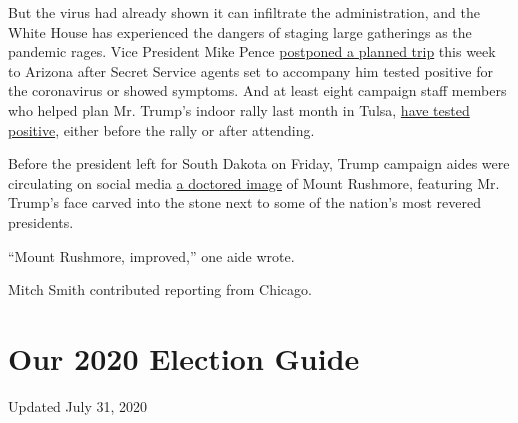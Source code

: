 But the virus had already shown it can infiltrate the administration,
and the White House has experienced the dangers of staging large
gatherings as the pandemic rages. Vice President Mike Pence
\href{https://www.nytimes.com/2020/07/02/us/politics/pence-covid.html}{postponed
a planned trip} this week to Arizona after Secret Service agents set to
accompany him tested positive for the coronavirus or showed symptoms.
And at least eight campaign staff members who helped plan Mr. Trump's
indoor rally last month in Tulsa,
\href{https://www.nytimes.com/2020/06/22/us/politics/trump-campaign-coronavirus-tulsa.html}{have
tested positive}, either before the rally or after attending.

Before the president left for South Dakota on Friday, Trump campaign
aides were circulating on social media
\href{https://twitter.com/abigailmarone/status/1279044148184694787}{a
doctored image} of Mount Rushmore, featuring Mr. Trump's face carved
into the stone next to some of the nation's most revered presidents.

``Mount Rushmore, improved,'' one aide wrote.

Mitch Smith contributed reporting from Chicago.

\hypertarget{our-2020-election-guide}{%
\section{Our 2020 Election Guide}\label{our-2020-election-guide}}

Updated July 31, 2020

